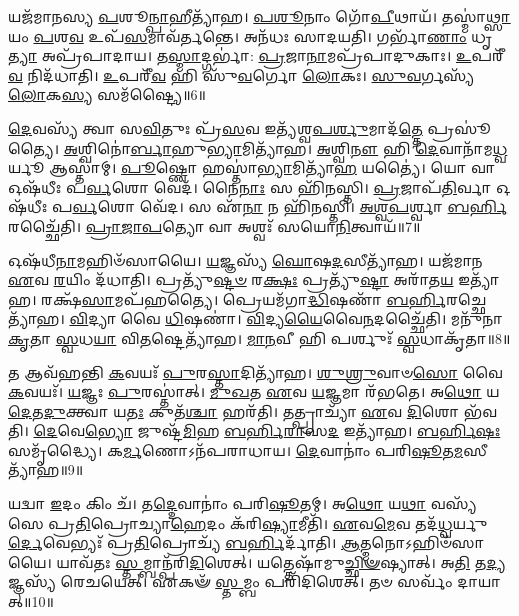 𑌯𑌜᳴𑌮𑌾𑌨𑌸𑍍𑌯 \ul{𑌪}\-𑌶𑍂\-\ul{𑌨𑍍𑌪𑌾}\-𑌹𑍀𑌤𑍍𑌯𑌾᳴𑌹।
\-\ul{𑌪}\-\-\ul{𑌶𑍂}\-𑌨𑌾𑌂 𑌗𑍋᳴\-\ul{𑌪𑍀}\-𑌥𑌾𑌯᳴।
𑌤𑌸𑍍𑌮𑌾॑\-\ul{𑌥𑍍𑌸𑌾}\-𑌯𑌂 \ul{𑌪}\-𑌶\-\ul{𑌵} 𑌉𑌪᳴\-\ul{𑌸}\-𑌮𑌾𑌵᳴𑌰𑍍𑌤𑌨𑍍𑌤𑍇।
𑌅𑌨᳴𑌧𑌃 𑌸𑌾𑌦𑌯𑌤𑌿।
𑌗𑌰𑍍𑌭𑌾᳴\-\ul{𑌣𑌾𑌂} 𑌧𑍃\-\ul{𑌤𑍍𑌯𑌾} 𑌅𑌪𑍍𑌰᳴𑌪𑌾𑌦𑌾𑌯।
𑌤\-\ul{𑌸𑍍𑌮𑌾}\-𑌦𑍍𑌗𑌰𑍍𑌭𑌾॑: \ul{𑌪𑍍𑌰}\-𑌜𑌾\-\ul{𑌨𑌾}\-𑌮𑌪𑍍𑌰᳴𑌪𑌾𑌦𑍁𑌕𑌾𑌃।
\-\ul{𑌉}\-𑌪𑌰𑍀᳴\-\ul{𑌵} 𑌨𑌿𑌦᳴𑌧𑌾𑌤𑌿।
\-\ul{𑌉}\-𑌪𑌰𑍀᳴\-\ul{𑌵} 𑌹𑌿 𑌸𑍁᳴\-\ul{𑌵}\-𑌰𑍍𑌗𑍋 \ul{𑌲𑍋}\-𑌕𑌃।
\-\ul{𑌸𑍁}\-\-\ul{𑌵}\-𑌰𑍍𑌗𑌸𑍍𑌯᳴ \ul{𑌲𑍋}\-𑌕\-\ul{𑌸𑍍𑌯} 𑌸𑌮᳴𑌷𑍍𑌟𑍍𑌯𑍈॥6॥\anuvakamend[\-\ul{𑌪}\-𑌶𑌵𑌃᳴ 𑌕𑌰𑍋𑌤𑌿 \ul{𑌪}\-𑌶𑌵𑍋᳴ 𑌦𑍇𑌵\-\ul{𑌭𑌾}\-𑌗𑌮𑌿𑌤𑍍𑌯𑌾᳴𑌹 𑌕𑌰𑍋\-\ul{𑌤𑌿} 𑌨𑌵᳴ 𑌚]

\-\ul{𑌦𑍇}\-𑌵𑌸𑍍𑌯᳴ 𑌤𑍍𑌵𑌾 𑌸\-\ul{𑌵𑌿}\-𑌤𑍁𑌃 𑌪𑍍𑌰᳴\-\ul{𑌸}\-𑌵 𑌇𑌤𑍍𑌯᳴𑌶𑍍𑌵\-\ul{𑌪}\-\-\ul{𑌰𑍍}\-𑌶𑍁𑌮𑌾𑌦᳴\-\ul{𑌤𑍍𑌤𑍇} 𑌪𑍍𑌰𑌸𑍂॑𑌤𑍍𑌯𑍈।
\-\ul{𑌅}\-𑌶𑍍𑌵𑌿𑌨𑍋॑\-\ul{𑌰𑍍𑌬𑌾}\-𑌹𑍁\-\ul{𑌭𑍍𑌯𑌾}\-𑌮𑌿𑌤𑍍𑌯𑌾᳴𑌹।
\-\ul{𑌅}\-𑌶𑍍𑌵𑌿\-\ul{𑌨𑍗} 𑌹𑌿 \ul{𑌦𑍇}\-𑌵𑌾𑌨𑌾᳴𑌮\-\ul{𑌧𑍍𑌵}\-𑌰𑍍𑌯𑍂 𑌆𑌸𑍍𑌤𑌾॑𑌮𑍍।
\-\ul{𑌪𑍂}\-𑌷𑍍𑌣𑍋 𑌹𑌸𑍍𑌤𑌾॑\-\ul{𑌭𑍍𑌯𑌾}\-𑌮𑌿𑌤𑍍𑌯𑌾᳴\-\ul{𑌹} 𑌯𑌤𑍍𑌯𑍈॑।
𑌯𑍋 𑌵𑌾 𑌓𑌷᳴𑌧𑍀𑌃 𑌪\-\ul{𑌰𑍍𑌵}\-𑌶𑍋 𑌵𑍇𑌦᳴।
𑌨𑍈\-\ul{𑌨𑌾𑌃} 𑌸 𑌹𑌿᳴𑌨𑌸𑍍𑌤𑌿।
\-\ul{𑌪𑍍𑌰}\-𑌜𑌾𑌪᳴\-\ul{𑌤𑌿}\-𑌰𑍍𑌵𑌾 𑌓𑌷᳴𑌧𑍀𑌃 𑌪\-\ul{𑌰𑍍𑌵}\-𑌶𑍋 𑌵𑍇᳴𑌦।
𑌸 𑌏᳴\-\ul{𑌨𑌾} 𑌨 𑌹𑌿᳴𑌨𑌸𑍍𑌤𑌿।
\-\ul{𑌅}\-\-\ul{𑌶𑍍𑌵}\-\-\ul{𑌪}\-𑌰𑍍𑌶𑍍𑌵𑌾 \ul{𑌬}\-\-\ul{𑌰𑍍}\-𑌹𑌿𑌰𑌚𑍍𑌛𑍈᳴𑌤𑌿।
\-\ul{𑌪𑍍𑌰𑌾}\-\-\ul{𑌜𑌾}\-\-\ul{𑌪}\-𑌤𑍍𑌯𑍋 𑌵𑌾 𑌅𑌶𑍍𑌵𑌃᳴ 𑌸𑌯𑍋\-\ul{𑌨𑌿}\-𑌤𑍍𑌵𑌾𑌯᳴॥7॥

𑌓𑌷᳴𑌧𑍀\-\ul{𑌨𑌾}\-𑌮𑌹𑌿𑍞᳴𑌸𑌾𑌯𑍈।
\-\ul{𑌯}\-𑌜𑍍𑌞𑌸𑍍𑌯᳴ \ul{𑌘𑍋}\-𑌷\-\ul{𑌦}\-𑌸𑍀𑌤𑍍𑌯𑌾᳴𑌹।
𑌯𑌜᳴𑌮𑌾𑌨 \ul{𑌏}\-𑌵 \ul{𑌰}\-𑌯𑌿𑌂 𑌦᳴𑌧𑌾𑌤𑌿।
𑌪𑍍𑌰𑌤𑍍𑌯𑍁᳴\-\ul{𑌷𑍍𑌟}\-\-\ul{𑍞} 𑌰\-\ul{𑌕𑍍𑌷𑌃} 𑌪𑍍𑌰𑌤𑍍𑌯𑍁᳴\-\ul{𑌷𑍍𑌟𑌾} 𑌅𑌰𑌾᳴𑌤\-\ul{𑌯} 𑌇𑌤𑍍𑌯𑌾᳴𑌹।
𑌰𑌕𑍍𑌷᳴\-\ul{𑌸𑌾}\-𑌮𑌪᳴𑌹𑌤𑍍𑌯𑍈।
𑌪𑍍𑌰𑍇𑌯𑌮᳴𑌗𑌾\-\ul{𑌦𑍍𑌧𑌿}\-𑌷𑌣𑌾᳴ \ul{𑌬}\-\-\ul{𑌰𑍍}\-𑌹𑌿𑌰𑌚𑍍𑌛𑍇𑌤𑍍𑌯𑌾᳴𑌹।
\-\ul{𑌵𑌿}\-𑌦𑍍𑌯𑌾 𑌵𑍈 \ul{𑌧𑌿}\-𑌷𑌣𑌾॑।
\-\ul{𑌵𑌿}\-𑌦𑍍𑌯\-\ul{𑌯𑍈}\-𑌵𑍈\-\ul{𑌨}\-𑌦𑌚𑍍𑌛𑍈᳴𑌤𑌿।
𑌮𑌨𑍁᳴𑌨𑌾 \ul{𑌕𑍃}\-𑌤𑌾 \ul{𑌸𑍍𑌵}\-𑌧\-\ul{𑌯𑌾} 𑌵𑌿\-\ul{𑌤}\-𑌷𑍍𑌟𑍇𑌤𑍍𑌯𑌾᳴𑌹।
\-\ul{𑌮𑌾}\-\-\ul{𑌨}\-𑌵𑍀 𑌹𑌿 𑌪𑌰𑍍\mbox{}𑌶𑍁𑌃᳴ \ul{𑌸𑍍𑌵}\-𑌧𑌾𑌕𑍃᳴𑌤𑌾॥8॥

𑌤 𑌆𑌵᳴𑌹𑌨𑍍𑌤𑌿 \ul{𑌕}\-𑌵𑌯𑌃᳴ \ul{𑌪𑍁}\-𑌰\-\ul{𑌸𑍍𑌤𑌾}\-𑌦𑌿𑌤𑍍𑌯𑌾᳴𑌹।
\-\ul{𑌶𑍁}\-\-\ul{𑌶𑍍𑌰𑍁}\-𑌵𑌾𑍞\-\ul{𑌸𑍋} 𑌵𑍈 \ul{𑌕}\-𑌵𑌯𑌃᳴।
\-\ul{𑌯}\-𑌜𑍍𑌞𑌃 \ul{𑌪𑍁}\-𑌰𑌸𑍍𑌤𑌾॑𑌤𑍍।
\-\ul{𑌮𑍁}\-\-\ul{𑌖}\-𑌤 \ul{𑌏}\-𑌵 \ul{𑌯}\-𑌜𑍍𑌞𑌮𑌾 𑌰᳴𑌭𑌤𑍇।
𑌅\-\ul{𑌥𑍋} 𑌯\-\ul{𑌦𑍇}\-𑌤\-\ul{𑌦𑍁}\-𑌕𑍍𑌤𑍍𑌵𑌾 𑌯\-\ul{𑌤𑌃} 𑌕𑍁𑌤᳴\-\ul{𑌶𑍍𑌚𑌾} 𑌹𑌰᳴𑌤𑌿।
𑌤𑌤𑍍𑌪𑍍𑌰𑌾𑌚𑍍𑌯𑌾᳴ \ul{𑌏}\-𑌵 \ul{𑌦𑌿}\-𑌶𑍋 𑌭᳴𑌵𑌤𑌿।
\-\ul{𑌦𑍇}\-𑌵𑍇\-\ul{𑌭𑍍𑌯𑍋} 𑌜𑍁𑌷𑍍𑌟᳴\-\ul{𑌮𑌿}\-𑌹 \ul{𑌬}\-\-\ul{𑌰𑍍}\-𑌹𑌿\-\ul{𑌰𑌾}\-𑌸\-\ul{𑌦} 𑌇𑌤𑍍𑌯𑌾᳴𑌹।
\-\ul{𑌬}\-\-\ul{𑌰𑍍}\-\mbox{}𑌹𑌿\-\ul{𑌷𑌃} 𑌸𑌮𑍃᳴𑌦𑍍𑌧𑍍𑌯𑍈।
𑌕\-\ul{𑌰𑍍𑌮}\-𑌣𑍋\-𑌽𑌨᳴𑌪𑌰𑌾𑌧𑌾𑌯।
\-\ul{𑌦𑍇}\-𑌵𑌾𑌨𑌾𑌂॑ 𑌪𑌰𑌿\-\ul{𑌷𑍂}\-𑌤\-\ul{𑌮}\-𑌸𑍀𑌤𑍍𑌯𑌾᳴𑌹॥9॥

𑌯𑌦𑍍𑌵𑌾 \ul{𑌇}\-𑌦𑌂 𑌕𑌿𑌂 𑌚᳴।
𑌤\-\ul{𑌦𑍍𑌦𑍇}\-𑌵𑌾𑌨𑌾𑌂॑ 𑌪𑌰𑌿\-\ul{𑌷𑍂}\-𑌤𑌮𑍍।
𑌅\-\ul{𑌥𑍋} 𑌯\-\ul{𑌥𑌾} 𑌵𑌸𑍍𑌯᳴𑌸𑍇 𑌪𑍍𑌰\-\ul{𑌤𑌿}\-𑌪𑍍𑌰𑍋𑌚𑍍𑌯𑌾\-\ul{𑌹𑍇}\-𑌦𑌂 𑌕᳴𑌰𑌿\-\ul{𑌷𑍍𑌯𑌾}\-𑌮𑍀𑌤𑌿᳴।
\-\ul{𑌏}\-𑌵\-\ul{𑌮𑍇}\-𑌵 𑌤𑌦᳴\-\ul{𑌧𑍍𑌵}\-𑌰𑍍𑌯𑍁\-\ul{𑌰𑍍𑌦𑍇}\-𑌵𑍇𑌭𑍍𑌯𑌃᳴ 𑌪𑍍𑌰\-\ul{𑌤𑌿}\-𑌪𑍍𑌰𑍋𑌚𑍍𑌯᳴ \ul{𑌬}\-\-\ul{𑌰𑍍}\-𑌹𑌿𑌰𑍍𑌦𑌾᳴𑌤𑌿।
\-\ul{𑌆}\-𑌤𑍍𑌮𑌨𑍋\-𑌽𑌹𑌿𑍞᳴𑌸𑌾𑌯𑍈।
𑌯𑌾𑌵᳴𑌤𑌃 \ul{𑌸𑍍𑌤}\-𑌮𑍍𑌬𑌾𑌨𑍍𑌪᳴𑌰𑌿\-\ul{𑌦𑌿}\-𑌶𑍇𑌤𑍍।
𑌯𑌤𑍍𑌤𑍇𑌷𑌾᳴𑌮𑍁\-\ul{𑌚𑍍𑌛𑌿}\-\-\ul{𑍟}\-𑌷𑍍𑌯𑌾𑌤𑍍।
𑌅\-\ul{𑌤𑌿} 𑌤\-\ul{𑌦𑍍𑌯}\-𑌜𑍍𑌞𑌸𑍍𑌯᳴ 𑌰𑍇𑌚𑌯𑍇𑌤𑍍।
𑌏𑌕𑍟᳴ \ul{𑌸𑍍𑌤}\-𑌮𑍍𑌬𑌂 𑌪𑌰𑌿᳴𑌦𑌿𑌶𑍇𑌤𑍍।
𑌤𑍞 𑌸𑌰𑍍𑌵𑌂᳴ 𑌦𑌾𑌯𑌾𑌤𑍍॥10॥

